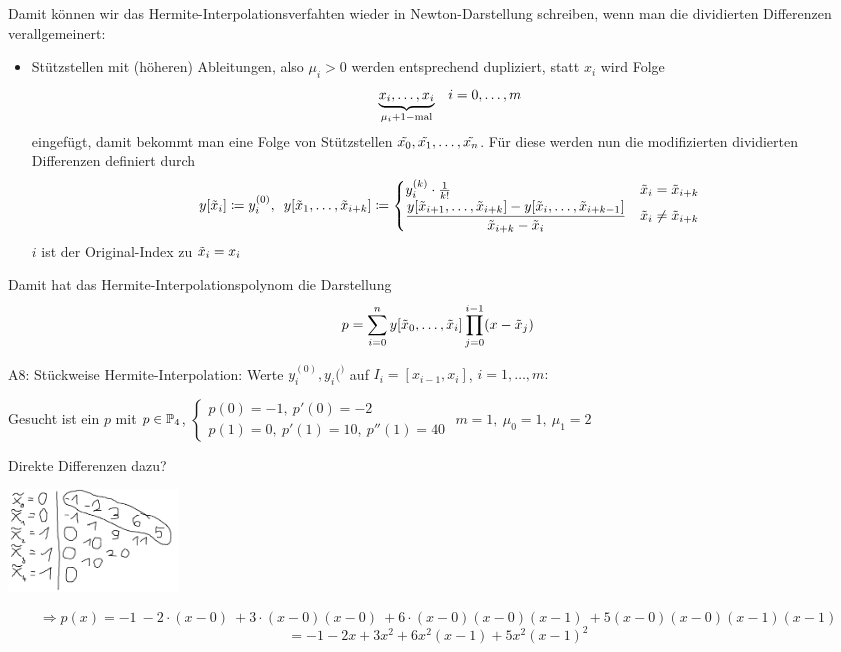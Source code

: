 Damit können wir das Hermite-Interpolationsverfahten wieder in Newton-Darstellung schreiben, wenn man die dividierten 
Differenzen verallgemeinert:\\
\newcommand{\tx}{\Tilde{x}}
\begin{itemize}
    \item Stützstellen mit (höheren) Ableitungen, also $\mu_i > 0$ werden entsprechend dupliziert, statt $x_i$ wird Folge
    \[\underset{\mu_i + 1-\text{mal}}{\underbrace{x_i, \dots, x_i}}\hspace{1em} i=0,\dots, m\]eingefügt, damit bekommt man 
    eine Folge von Stützstellen $\Tilde{x_0}, \Tilde{x_1}, \dots, \Tilde{x_n}$. Für diese werden nun die modifizierten 
    dividierten Differenzen definiert durch \[
    y[\tx_i] \coloneqq y_i^{(0)}, \midspace y[\tx_1, \dots , \tx_{i+k}] \coloneqq \begin{cases}
        y_i^{(k)}\cdot \frac{1}{k!} & \tx_i = \tx_{i+k}\\
        \displaystyle\frac{y[\tx_{i+1}, \dots, \tx_{i+k}] - y[\tx_i, \dots, \tx_{i+k-1}]}{\tx_{i+k} - \tx_i} & \tx_i \neq 
        \tx_{i+k}
    \end{cases}
    \]
    $i$ ist der Original-Index zu $\tx_i = x_i$
\end{itemize}
\begin{theorem}
    Damit hat das Hermite-Interpolationspolynom die Darstellung \[
    p=\sum_{i=0}^n y[\tx_0, \dots, \tx_i] \prod_{j=0}^{i-1}(x-\tx_j)
    \]
\end{theorem}

A8: Stückweise Hermite-Interpolation: Werte $y^{(0)}_i,y_i{(^)}$ auf $I_i=[x_{i-1},x_i]$, $i=1,\dots,m: $
\begin{example}
    Gesucht ist ein $p$ mit $p\in\mathbb{P}_4$, $\begin{cases}
        p(0)=-1, \ p'(0)= -2\\
        p(1)=0, \ p'(1)=10, \ p''(1)=40
    \end{cases}$
    $m=1,\ \mu_0=1, \ \mu_1=2$
\end{example}
Direkte Differenzen dazu?\\
\begin{center}
        \includegraphics[width=45mm]{../Bilder/x_3.png}\\
\end{center}
\[
\Rightarrow p(x)= -1\ -2\cdot(x-0)\ +3\cdot(x-0)(x-0)\ +6\cdot(x-0)(x-0)(x-1) \ +5(x-0)(x-0)(x-1)(x-1)\]
\[=-1-2x+3x^2+6x^2(x-1)+5x^2(x-1)^2
\]

